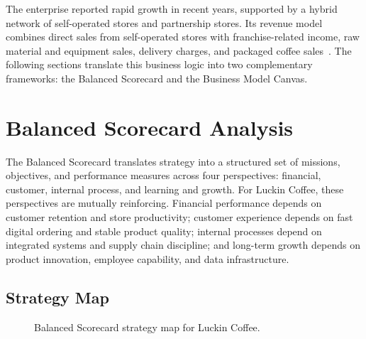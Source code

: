 \documentclass[12pt,a4paper]{article}
\begin{document}
The enterprise reported rapid growth in recent years, supported by a hybrid network of self-operated stores and partnership stores. Its revenue model combines direct sales from self-operated stores with franchise-related income, raw material and equipment sales, delivery charges, and packaged coffee sales~\cite{luckin2025annual,luckin2025results}. The following sections translate this business logic into two complementary frameworks: the Balanced Scorecard and the Business Model Canvas.

\section{Balanced Scorecard Analysis}

The Balanced Scorecard translates strategy into a structured set of missions, objectives, and performance measures across four perspectives: financial, customer, internal process, and learning and growth. For Luckin Coffee, these perspectives are mutually reinforcing. Financial performance depends on customer retention and store productivity; customer experience depends on fast digital ordering and stable product quality; internal processes depend on integrated systems and supply chain discipline; and long-term growth depends on product innovation, employee capability, and data infrastructure.

\subsection{Strategy Map}

\begin{figure}[H]
  \centering
  \caption{Balanced Scorecard strategy map for Luckin Coffee.}
\end{figure}
\end{document}
